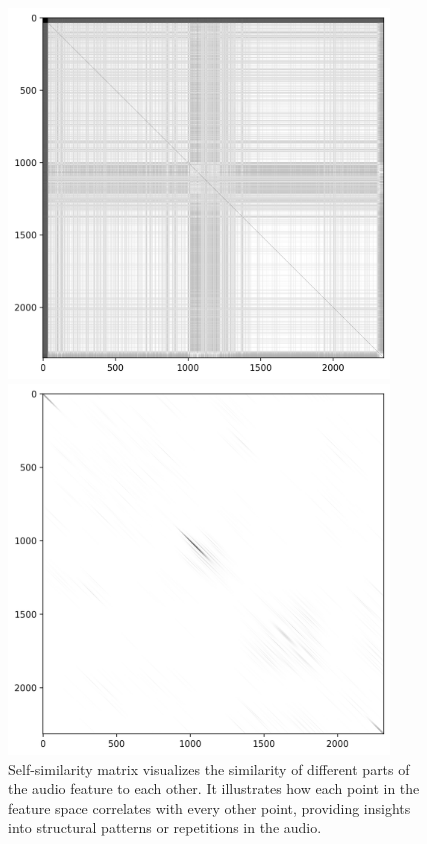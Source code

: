 \begin{figure}[ht]
    \centering
    \begin{minipage}{0.45\textwidth}
        \centering
        \includegraphics[width=0.9\textwidth]{figures/images/salami_391_R matrix after Gaussian smoothing.png} %
        \caption[self-similarity matrix]{Self-similarity matrix visualizes the similarity of different parts of the audio feature to each other. It illustrates how each point in the feature space correlates with every other point, providing insights into structural patterns or repetitions in the audio.}
    \end{minipage}\hfill
    \begin{minipage}{0.45\textwidth}
        \centering
        \includegraphics[width=0.9\textwidth]{figures/images/salami_391_Lag matrix after Gaussian smoothing.png} %

\end{minipage}
\end{figure}
